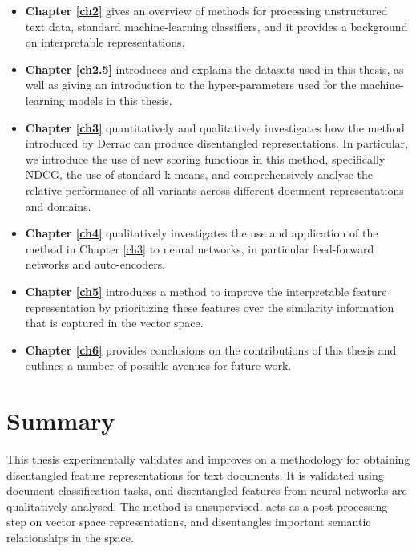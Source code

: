 \begin{itemize}
	\item \textbf{Chapter \ref{ch2}} gives an overview of methods for processing unstructured text data, standard machine-learning classifiers, and it provides a background on interpretable representations.
	\item \textbf{Chapter \ref{ch2.5}} introduces and explains the datasets used in this thesis, as well as giving an introduction to the hyper-parameters  used for the machine-learning models in this thesis.
	\item \textbf{Chapter \ref{ch3}} quantitatively and qualitatively investigates how the method introduced by Derrac \cite{Derrac2015} can produce disentangled representations. In particular, we introduce the use of new scoring functions in this method, specifically NDCG, the use of standard k-means,  and comprehensively analyse the relative performance of all variants across different document representations and domains. 
	\item \textbf{Chapter \ref{ch4}} qualitatively investigates the use and application of the method in Chapter \ref{ch3} to neural networks, in particular feed-forward networks and auto-encoders.
	\item \textbf{Chapter \ref{ch5}} introduces a  method to improve the interpretable feature representation by prioritizing these features over the similarity information that is captured in the vector space.
	\item \textbf{Chapter \ref{ch6}} provides conclusions on the contributions of this thesis and outlines a number of possible avenues for future work.
\end{itemize}


\section{Summary}

This thesis experimentally validates and improves on a methodology for obtaining disentangled feature representations for text documents. It is validated using document classification tasks, and disentangled features from neural networks are  qualitatively  analysed. The method is unsupervised, acts as a post-processing step on vector space representations, and  disentangles important semantic relationships in the space.  



